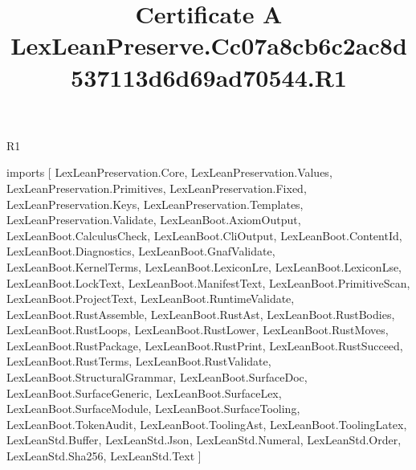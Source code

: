 \begin{lexlean}{R1}
\title{Certificate A LexLeanPreserve.Cc07a8cb6c2ac8d537113d6d69ad70544.R1}
\begin{coremodule}
imports [
  LexLeanPreservation.Core,
  LexLeanPreservation.Values,
  LexLeanPreservation.Primitives,
  LexLeanPreservation.Fixed,
  LexLeanPreservation.Keys,
  LexLeanPreservation.Templates,
  LexLeanPreservation.Validate,
  LexLeanBoot.AxiomOutput,
  LexLeanBoot.CalculusCheck,
  LexLeanBoot.CliOutput,
  LexLeanBoot.ContentId,
  LexLeanBoot.Diagnostics,
  LexLeanBoot.GnafValidate,
  LexLeanBoot.KernelTerms,
  LexLeanBoot.LexiconLre,
  LexLeanBoot.LexiconLse,
  LexLeanBoot.LockText,
  LexLeanBoot.ManifestText,
  LexLeanBoot.PrimitiveScan,
  LexLeanBoot.ProjectText,
  LexLeanBoot.RuntimeValidate,
  LexLeanBoot.RustAssemble,
  LexLeanBoot.RustAst,
  LexLeanBoot.RustBodies,
  LexLeanBoot.RustLoops,
  LexLeanBoot.RustLower,
  LexLeanBoot.RustMoves,
  LexLeanBoot.RustPackage,
  LexLeanBoot.RustPrint,
  LexLeanBoot.RustSucceed,
  LexLeanBoot.RustTerms,
  LexLeanBoot.RustValidate,
  LexLeanBoot.StructuralGrammar,
  LexLeanBoot.SurfaceDoc,
  LexLeanBoot.SurfaceGeneric,
  LexLeanBoot.SurfaceLex,
  LexLeanBoot.SurfaceModule,
  LexLeanBoot.SurfaceTooling,
  LexLeanBoot.TokenAudit,
  LexLeanBoot.ToolingAst,
  LexLeanBoot.ToolingLatex,
  LexLeanStd.Buffer,
  LexLeanStd.Json,
  LexLeanStd.Numeral,
  LexLeanStd.Order,
  LexLeanStd.Sha256,
  LexLeanStd.Text
]


\end{coremodule}
\end{lexlean}
